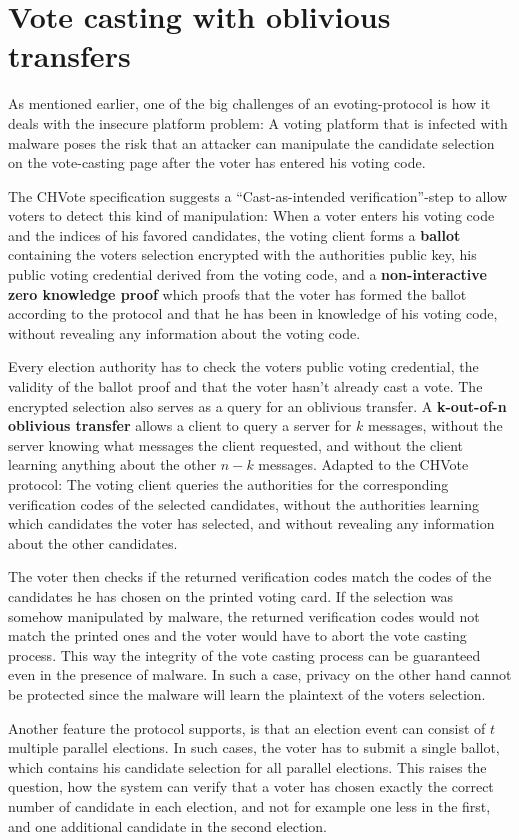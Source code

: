 \section{Vote casting with oblivious transfers}
As mentioned earlier, one of the big challenges of an evoting-protocol is how it deals with the insecure platform problem: A voting platform that is infected with malware poses the risk that an attacker can manipulate the candidate selection on the vote-casting page after the voter has entered his voting code. 

The CHVote specification suggests a "`Cast-as-intended verification"'-step to allow voters to detect this kind of manipulation: When a voter enters his voting code and the indices of his favored candidates, the voting client forms a \textbf{ballot} containing the voters selection encrypted with the authorities public key, his public voting credential derived from the voting code, and a \textbf{non-interactive zero knowledge proof} which proofs that the voter has formed the ballot according to the protocol and that he has been in knowledge of his voting code, without revealing any information about the voting code.

Every election authority has to check the voters public voting credential, the validity of the ballot proof and that the voter hasn't already cast a vote. The encrypted selection also serves as a query for an oblivious transfer. A \textbf{k-out-of-n oblivious transfer} allows a client to query a server for $k$ messages, without the server knowing what messages the client requested, and without the client learning anything about the other $n-k$ messages. Adapted to the CHVote protocol: The voting client queries the authorities for the corresponding verification codes of the selected candidates, without the authorities learning which candidates the voter has selected, and without revealing any information about the other candidates. 

The voter then checks if the returned verification codes match the codes of the candidates he has chosen on the printed voting card. If the selection was somehow manipulated by malware, the returned verification codes would not match the printed ones and the voter would have to abort the vote casting process. This way the integrity of the vote casting process can be guaranteed even in the presence of malware. In such a case, privacy on the other hand cannot be protected since the malware will learn the plaintext of the voters selection.

Another feature the protocol supports, is that an election event can consist of $t$ multiple parallel elections. In such cases, the voter has to submit a single ballot, which contains his candidate selection for all parallel elections. This raises the question, how the system can verify that a voter has chosen exactly the correct number of candidate in each election, and not for example one less in the first, and one additional candidate in the second election.

